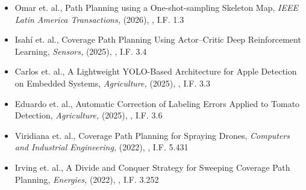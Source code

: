 \begin{itemize} 
\item Omar et. al., Path Planning using a One-shot-sampling Skeleton Map,\textit{ IEEE Latin America Transactions,} (2026), \href{https://latamt.ieeer9.org/index.php/transactions/article/view/10253} {\faFilePdfO}, I.F. 1.3 
\item Isahí et. al., Coverage Path Planning Using Actor–Critic Deep Reinforcement Learning,\textit{ Sensors,} (2025), \href{https://doi.org/10.3390/s25051592} {\faFilePdfO}, I.F. 3.4 
\item Carlos et. al., A Lightweight YOLO-Based Architecture for Apple Detection on Embedded Systems,\textit{ Agriculture,} (2025), \href{https://doi.org/10.3390/agriculture15080838} {\faFilePdfO}, I.F. 3.3 
\item Eduardo et. al., Automatic Correction of Labeling Errors Applied to Tomato Detection,\textit{ Agriculture,} (2025), \href{https://doi.org/10.3390/agriculture15121291} {\faFilePdfO}, I.F. 3.6 
\item Viridiana et. al., Coverage Path Planning for Spraying Drones,\textit{ Computers and Industrial Engineering,} (2022), \href{https://doi.org/10.1016/j.cie.2022.108125} {\faFilePdfO}, I.F. 5.431 
\item Irving et. al., A Divide and Conquer Strategy for Sweeping Coverage Path Planning,\textit{ Energies,} (2022), \href{https://doi.org/10.3390/en15217898} {\faFilePdfO}, I.F. 3.252 
\end{itemize} 
